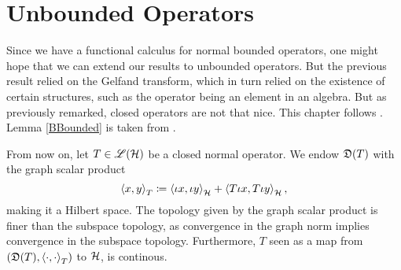 \section{Unbounded Operators}



Since we have a functional calculus for normal bounded operators, one might hope 
that we can extend our results to unbounded operators. But the previous 
result relied on the Gelfand transform, which in turn relied on the existence
of certain structures, such as the operator being an element in an algebra. 
But as previously remarked, closed operators are not that nice.
This chapter follows \cite{LesHaupt}. Lemma \ref{BBounded} is taken from 
\cite[p. 319]{ConFuncAna}.

From now on, let $T \in \mathscr{L}(\mathcal{H})$ be a closed normal operator. 
We endow $\mathfrak{D}(T)$ with the graph scalar product
\[
 \left\langle x,y \right\rangle_T \coloneqq  \left\langle \iota x, \iota y \right\rangle_{\mathcal{H}} +
 \left\langle  T \iota x, T \iota y \right\rangle_{\mathcal{H}},
\]
making it a Hilbert space. The topology given by the graph scalar product
is finer than the subspace topology, as convergence in the graph norm
 implies convergence in the subspace topology. Furthermore,
$T$ seen as a map from $( \mathfrak{D}(T) , \left\langle \cdot, \cdot \right\rangle_T)$ to $\mathcal{H}$, is 
continous.

